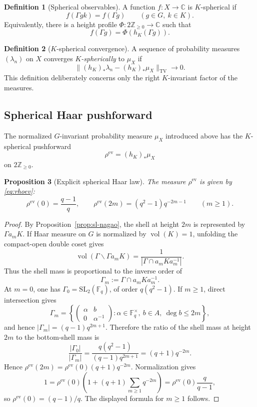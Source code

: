 \documentclass[11pt]{amsart}
\theoremstyle{definition}
\newtheorem{definition}{Definition}[section]
\theoremstyle{plain}
\newtheorem{proposition}[definition]{Proposition}
\newcommand{\Fq}{\mathbb F_q}
\newcommand{\ZZ}{\mathbb Z}
\newcommand{\CC}{\mathbb C}
\newcommand{\TV}{\operatorname{TV}}
\newcommand{\ev}{\mathrm{ev}}
\begin{document}
\begin{definition}[Spherical observables]
A function \(f:X\to\CC\) is \(K\)-spherical if
\[
f(\Gamma gk)=f(\Gamma g)\qquad(g\in G,\ k\in K).
\]
Equivalently, there is a height profile \(\Phi:2\ZZ_{\ge0}\to\CC\) such that
\[
f(\Gamma g)=\Phi(h_K(\Gamma g)).
\]
\end{definition}

\begin{definition}[\(K\)-spherical convergence]
A sequence of probability measures \((\lambda_n)\) on \(X\) converges
\emph{\(K\)-spherically} to \(\mu_X\) if
\[
\bigl\|(h_K)_*\lambda_n-(h_K)_*\mu_X\bigr\|_{\TV}\longrightarrow0.
\]
This definition deliberately concerns only the right \(K\)-invariant factor of
the measures.
\end{definition}

\subsection{Spherical Haar pushforward}
The normalized \(G\)-invariant probability measure \(\mu_X\) introduced above
has the \(K\)-spherical pushforward
\[
\rho^{\ev}=(h_K)_*\mu_X
\]
on \(2\ZZ_{\ge0}\).

\begin{proposition}[Explicit spherical Haar law]\label{prop:haar-rho}
The measure \(\rho^{\ev}\) is given by \eqref{eq:rhoev}:
\[
\rho^{\ev}(0)=\frac{q-1}{q},\qquad
\rho^{\ev}(2m)=(q^2-1)q^{-2m-1}\qquad(m\ge1).
\]
\end{proposition}

\begin{proof}
By Proposition~\ref{prop:sl-nagao}, the shell at height \(2m\) is represented
by \(\Gamma a_mK\).  If Haar measure on \(G\) is normalized by
\(\operatorname{vol}(K)=1\), unfolding the compact-open double coset gives
\[
\operatorname{vol}(\Gamma\backslash\Gamma a_mK)
   =\frac{1}{|\Gamma\cap a_mKa_m^{-1}|}.
\]
Thus the shell mass is proportional to the inverse order of
\[
\Gamma_m:=\Gamma\cap a_mKa_m^{-1}.
\]
At \(m=0\), one has \(\Gamma_0=\mathrm{SL}_2(\Fq)\), of order
\(q(q^2-1)\).  If \(m\ge1\), direct intersection gives
\[
\Gamma_m=
\left\{
\begin{pmatrix}\alpha&b\\0&\alpha^{-1}\end{pmatrix}:
\alpha\in\Fq^\times,\ b\in A,\ \deg b\le2m
\right\},
\]
and hence \(|\Gamma_m|=(q-1)q^{2m+1}\).  Therefore the ratio of the shell mass
at height \(2m\) to the bottom-shell mass is
\[
\frac{|\Gamma_0|}{|\Gamma_m|}
=\frac{q(q^2-1)}{(q-1)q^{2m+1}}
=(q+1)q^{-2m}.
\]
Hence \(\rho^{\ev}(2m)=\rho^{\ev}(0)(q+1)q^{-2m}\).  Normalization gives
\[
1=\rho^{\ev}(0)\left(1+(q+1)\sum_{m\ge1}q^{-2m}\right)
=\rho^{\ev}(0)\frac{q}{q-1},
\]
so \(\rho^{\ev}(0)=(q-1)/q\).  The displayed formula for \(m\ge1\) follows.
\end{proof}
\end{document}
